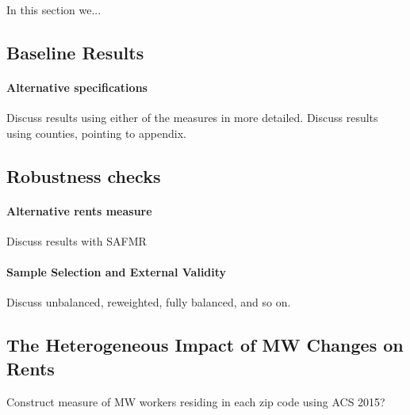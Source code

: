 
In this section we...

\subsection{Baseline Results}\label{sec:baseline_results}


\paragraph{Alternative specifications} 

Discuss results using either of the measures in more detailed.
Discuss results using counties, pointing to appendix.

\subsection{Robustness checks}\label{sec:sample_rest}

\paragraph{Alternative rents measure} 

Discuss results with SAFMR

\paragraph{Sample Selection and External Validity} 

Discuss unbalanced, reweighted, fully balanced, and so on.


\subsection{The Heterogeneous Impact of MW Changes on Rents}\label{sec:heter}

Construct measure of MW workers residing in each zip code using ACS 2015?
